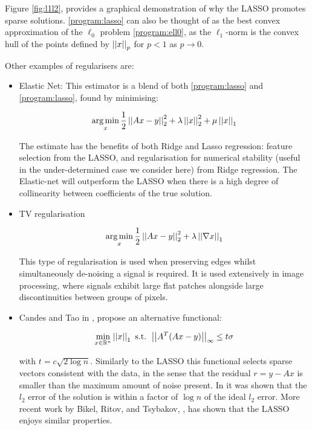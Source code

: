 \documentclass[12pt]{report}
\begin{document}
Figure \eqref{fig:l1l2}, provides a graphical demonstration of why the LASSO promotes sparse solutions. \eqref{program:lasso} can also be thought of as the best convex approximation of the \(\ell_0\) problem \eqref{program:ell0}, as the \(\ell_1\)-norm is the convex hull of the points defined by \(\left|\left|x\right|\right|_p\) for \(p < 1\) as \(p \rightarrow 0\). 


Other examples of regularisers are:

\begin{itemize}
\item Elastic Net: This estimator is a blend of both \eqref{program:lasso} and \eqref{program:lasso}, found by minimising:

\begin{equation}
\operatorname*{arg\,min}_x \frac{1}{2}\left|\left|Ax-y\right|\right|_2^2 + \lambda\left|\left|x\right|\right|_2^2 + \mu\left|\left|x\right|\right|_1
\label{program:enat}
\end{equation}

The estimate has the benefits of both Ridge and Lasso regression: feature selection from the LASSO, and regularisation for numerical stability (useful in the under-determined case we consider here) from Ridge regression. The Elastic-net will outperform the LASSO when there is a high degree of collinearity between coefficients of the true solution.

\item TV regularisation

\begin{equation}
\operatorname*{arg\,min}_x \frac{1}{2}\left|\left|Ax-y\right|\right|_2^2 +  \lambda\left|\left|\nabla x\right|\right|_1
\label{program:enat}
\end{equation}

This type of regularisation is used when preserving edges whilst simultaneously de-noising a signal is required. It is used extensively in image processing, where signals exhibit large flat patches alongside large discontinuities between groups of pixels.

\item Candes and Tao in \cite{candes2007dantzig}, propose an alternative  functional:

\begin{equation}
\min_{x \in {\mathbb{R}}^n} \left|\left|x\right|\right|_1 \text{ s.t. } \left|\left|A^T(Ax-y)\right|\right|_{\infty} \leq t\sigma
\end{equation}

with \(t = c\sqrt{2\log{n}}\). Similarly to the LASSO this functional selects sparse vectors consistent with the data, in the sense that the residual \(r = y - Ax\) is smaller than the maximum amount of noise present. In \cite{candes2007dantzig} it was shown that the \(l_2\) error of the solution is within a factor of \(\log{n}\) of the ideal \(l_2\) error. More recent work by Bikel, Ritov, and Tsybakov, \cite{bickel2009simultaneous}, has shown that the LASSO enjoys similar properties.
\end{itemize}
\end{document}
